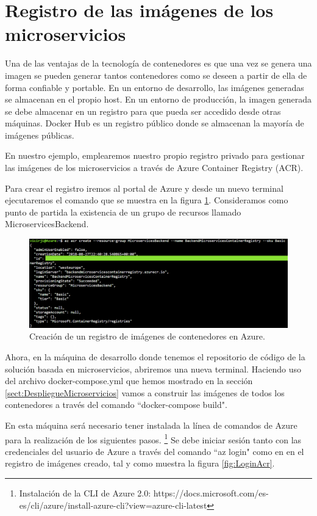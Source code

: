 \documentclass[11pt,spanish,listoffigures]{tfgetsinf}
\begin{document}
\section{Registro de las imágenes de los microservicios}

Una de las ventajas de la tecnología de contenedores es que una vez se genera una imagen se pueden generar tantos contenedores como se deseen a partir de ella de forma confiable y portable. \cite{Matthias} En un entorno de desarrollo, las imágenes generadas se almacenan en el propio host. En un entorno de producción, la imagen generada se debe almacenar en un registro para que pueda ser accedido desde otras máquinas. Docker Hub es un registro público donde se almacenan la mayoría de imágenes públicas.

En nuestro ejemplo, emplearemos nuestro propio registro privado para gestionar las imágenes de los microservicios a través de Azure Container Registry (ACR). \cite{DelaTorre2018}

Para crear el registro iremos al portal de Azure y desde un nuevo terminal ejecutaremos el comando que se muestra en la figura \ref{fig:CreateACR}. Consideramos como punto de partida la existencia de un grupo de recursos llamado MicroservicesBackend.

\begin{figure}[h]
\centering
\includegraphics[scale=0.50]{CreateACR}
\caption{Creación de un registro de imágenes de contenedores en Azure.}
\label{fig:CreateACR}
\end{figure}

Ahora, en la máquina de desarrollo donde tenemos el repositorio de código de la solución basada en microservicios, abriremos una nueva terminal. Haciendo uso del archivo docker-compose.yml que hemos mostrado en la sección \ref{sect:DespliegueMicroservicios}  vamos a construir las imágenes de todos los contenedores a través del comando ``docker-compose build".

En esta máquina será necesario tener instalada la línea de comandos de Azure para la realización de los siguientes pasos. \footnote{ Instalación de la CLI de Azure 2.0: https://docs.microsoft.com/es-es/cli/azure/install-azure-cli?view=azure-cli-latest} Se debe iniciar sesión tanto con las credenciales del usuario de Azure a través del comando ``az login" como en en el registro de imágenes creado, tal y como muestra la figura \ref{fig:LoginAcr}.
\end{document}
